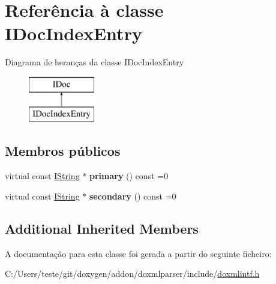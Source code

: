 \hypertarget{class_i_doc_index_entry}{\section{Referência à classe I\-Doc\-Index\-Entry}
\label{class_i_doc_index_entry}
}
Diagrama de heranças da classe I\-Doc\-Index\-Entry\begin{figure}[H]
\begin{center}
\leavevmode
\includegraphics[height=2.000000cm]{class_i_doc_index_entry}
\end{center}
\end{figure}
\subsection*{Membros públicos}
\begin{DoxyCompactItemize}
\item 
\hypertarget{class_i_doc_index_entry_a5f0a97c2c9e2fa3bd3a5b0c62f432ec1}{virtual const \hyperlink{class_i_string}{I\-String} $\ast$ {\bfseries primary} () const =0}\label{class_i_doc_index_entry_a5f0a97c2c9e2fa3bd3a5b0c62f432ec1}

\item 
\hypertarget{class_i_doc_index_entry_aee8845a5939fddc57d2faa03ac41a5cc}{virtual const \hyperlink{class_i_string}{I\-String} $\ast$ {\bfseries secondary} () const =0}\label{class_i_doc_index_entry_aee8845a5939fddc57d2faa03ac41a5cc}

\end{DoxyCompactItemize}
\subsection*{Additional Inherited Members}


A documentação para esta classe foi gerada a partir do seguinte ficheiro\-:\begin{DoxyCompactItemize}
\item 
C\-:/\-Users/teste/git/doxygen/addon/doxmlparser/include/\hyperlink{include_2doxmlintf_8h}{doxmlintf.\-h}\end{DoxyCompactItemize}
